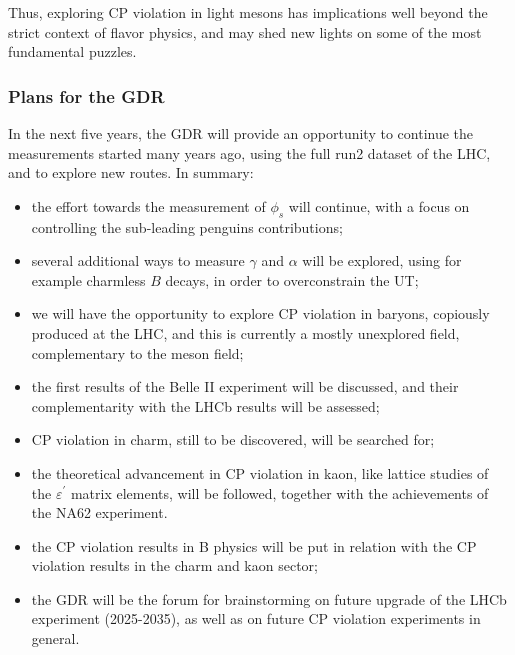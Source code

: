 Thus, exploring CP violation in light mesons has implications well beyond the
strict context of flavor physics, and may shed new lights on some of the most
fundamental puzzles.





\subsubsection*{Plans for the GDR}
In the next five years, the GDR will provide an opportunity to continue the measurements started many years ago, using the full run2 dataset of the LHC, and to explore new routes.  In summary:
\begin{itemize}
\item the effort towards the measurement of $\phi_{s}$ will continue, with a focus on controlling the sub-leading penguins contributions;
\item several additional ways to measure $\gamma$ and $\alpha$ will be explored, using for example charmless $B$ decays, in order  to overconstrain the UT;
\item we will have the opportunity to explore CP violation in baryons, copiously produced at the LHC, and this is currently a mostly unexplored field, complementary to the meson field;
\item  the first results  of the Belle II experiment will be discussed, and  their complementarity with the LHCb results will be assessed;
\item CP violation in charm,  still to be discovered, will be searched for;
\item the theoretical advancement in CP violation in kaon, like  lattice studies of the $\varepsilon^{\prime}$ matrix elements, will be followed, together with the achievements of the  NA62 experiment.
\item the CP violation results in B physics will be put in relation with the CP violation results in the charm and kaon sector; 
\item the GDR will be the forum for  brainstorming on future upgrade of the LHCb experiment (2025-2035), as well as on future CP violation experiments in general.
\end{itemize}

